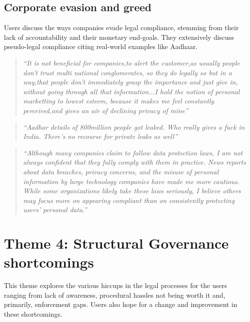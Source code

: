         
\subsection{Corporate evasion and greed} \label{T3.3:Moneypriorities}
Users discuss the ways companies evade legal compliance, stemming from their lack of accountability and their monetary end-goals. They extensively discuss pseudo-legal compliance citing real-world examples like Aadhaar.
        \begin{quote}
            \textit{``It is not beneficial for companies,to alert the customer,as usually people don't trust multi national conglomerates, so they do legally so but in a way,that people don't immediately grasp the importance and just give in, without going through all that information...I hold the notion of personal marketting to lowest esteem, because it makes me feel constantly perceived,and gives an air of declining privacy of mine''}
        \end{quote}
        \begin{quote}
            \textit{``Aadhar details of 800million people got leaked. Who really gives a fuck in India. There's no recourse for private leaks as well''}
        \end{quote}
        \begin{quote}
            \textit{``Although many companies claim to follow data protection laws, I am not always confident that they fully comply with them in practice. News reports about data breaches, privacy concerns, and the misuse of personal information by large technology companies have made me more cautious. While some organizations likely take these laws seriously, I believe others may focus more on appearing compliant than on consistently protecting users’ personal data.''}
        \end{quote}


\section{Theme 4: Structural Governance shortcomings} \label{T4:regulation issues}
This theme explores the various hiccups in the legal processes for the users ranging from lack of awareness, procedural hassles not being worth it and, primarily, enforcement gaps. Users also hope for a change and improvement in these shortcomings.


